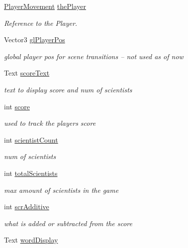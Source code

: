 \begin{DoxyCompactItemize}
\hyperlink{class_player_movement}{Player\+Movement} \hyperlink{class_global_controller_a801f782511818beca77fc2dbd425408d}{the\+Player}
\begin{DoxyCompactList}\small\item\em Reference to the Player. \end{DoxyCompactList}\item 
Vector3 \hyperlink{class_global_controller_a7017a9cd75e3d669ccc9750174d054bd}{gl\+Player\+Pos}
\begin{DoxyCompactList}\small\item\em global player pos for scene transitions -- not used as of now \end{DoxyCompactList}\item 
Text \hyperlink{class_global_controller_ab792e99bb983f76fdccd852181c5d57a}{score\+Text}
\begin{DoxyCompactList}\small\item\em text to display score and num of scientists \end{DoxyCompactList}\item 
int \hyperlink{class_global_controller_aced28959bd33c639a9d5a0d09a402cbf}{score}
\begin{DoxyCompactList}\small\item\em used to track the player\textquotesingle{}s score \end{DoxyCompactList}\item 
int \hyperlink{class_global_controller_a48edc8164385a8fc43093ffa9805b3cb}{scientist\+Count}
\begin{DoxyCompactList}\small\item\em num of scientists \end{DoxyCompactList}\item 
int \hyperlink{class_global_controller_ad02eba986e29262743629b40f12372e7}{total\+Scientists}
\begin{DoxyCompactList}\small\item\em max amount of scientists in the game \end{DoxyCompactList}\item 
int \hyperlink{class_global_controller_a943a3c4c7e4618dbeffb3870d97a0b68}{scr\+Additive}
\begin{DoxyCompactList}\small\item\em what is added or subtracted from the score \end{DoxyCompactList}\item 
Text \hyperlink{class_global_controller_a8140e86b843db24566ec5fbf223eeafa}{word\+Display}

\end{DoxyCompactItemize}
